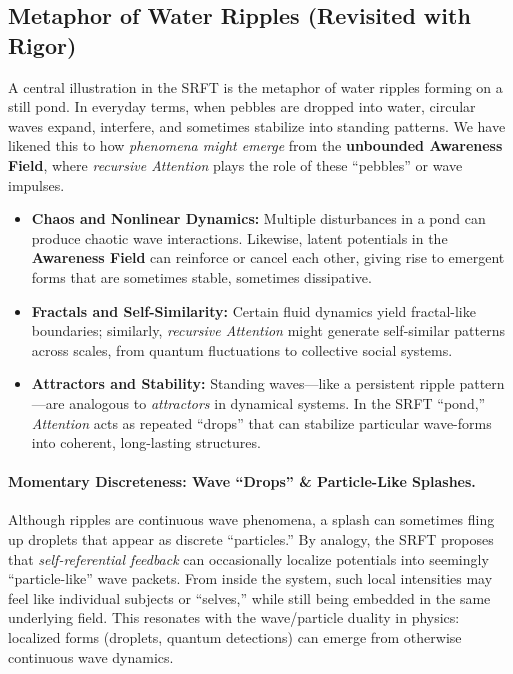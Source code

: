 \documentclass[12pt,a4paper]{article}
\begin{document}
\subsection{Metaphor of Water Ripples (Revisited with Rigor)}
\label{subsec:ripples-revisited}

A central illustration in the SRFT is the metaphor of water ripples forming on a still pond. 
In everyday terms, when pebbles are dropped into water, circular waves expand, interfere, and 
sometimes stabilize into standing patterns. We have likened this to how \emph{phenomena might emerge} 
from the \textbf{unbounded Awareness Field}, where \emph{recursive Attention} plays the role of 
these “pebbles” or wave impulses.

\begin{itemize}
    \item \textbf{Chaos and Nonlinear Dynamics:} 
    Multiple disturbances in a pond can produce chaotic wave interactions. 
    Likewise, latent potentials in the \textbf{Awareness Field} can reinforce or cancel each other, 
    giving rise to emergent forms that are sometimes stable, sometimes dissipative.

    \item \textbf{Fractals and Self-Similarity:} 
    Certain fluid dynamics yield fractal-like boundaries; similarly, \emph{recursive Attention} 
    might generate self-similar patterns across scales, from quantum fluctuations to collective 
    social systems.

    \item \textbf{Attractors and Stability:} 
    Standing waves—like a persistent ripple pattern—are analogous to \emph{attractors} 
    in dynamical systems. In the SRFT “pond,” \emph{Attention} acts as repeated “drops” 
    that can stabilize particular wave-forms into coherent, long-lasting structures.
\end{itemize}

\paragraph{Momentary Discreteness: Wave “Drops” \& Particle-Like Splashes.}
Although ripples are continuous wave phenomena, a splash can sometimes fling up droplets that 
appear as discrete “particles.” By analogy, the SRFT proposes that \emph{self-referential 
feedback} can occasionally localize potentials into seemingly “particle-like” wave packets. 
From inside the system, such local intensities may feel like individual subjects or “selves,” 
while still being embedded in the same underlying field. This resonates with the wave/particle 
duality in physics: localized forms (droplets, quantum detections) can emerge from otherwise 
continuous wave dynamics.
\end{document}
